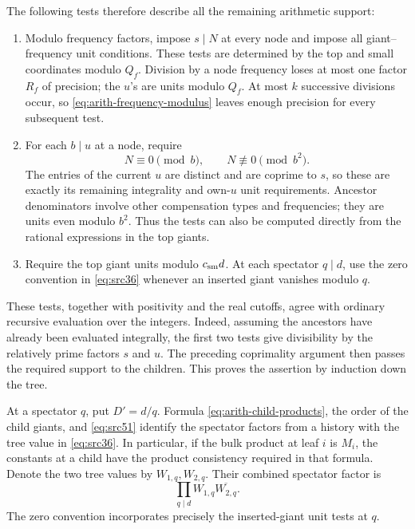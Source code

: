 The following tests therefore describe all the remaining arithmetic support:
\begin{enumerate}
\item Modulo frequency factors, impose $s\mid N$ at every node and impose
all giant--frequency unit conditions. These tests are determined by the top
and small coordinates modulo $Q_f$. Division by a node frequency loses at
most one factor $R_f$ of precision; the $u$'s are units modulo $Q_f$. At most
$k$ successive divisions occur, so \eqref{eq:arith-frequency-modulus} leaves
enough precision for every subsequent test.
\item For each $b\mid u$ at a node, require
\begin{equation}\label{eq:arith-internal-tests}
                        N\equiv0\pmod b,
             \qquad N\not\equiv0\pmod{b^2}.
\end{equation}
The entries of the current $u$ are distinct and are coprime to $s$, so these
are exactly its remaining integrality and own-$u$ unit requirements.
Ancestor denominators involve other compensation types and frequencies;
they are units even modulo $b^2$. Thus the tests can also be computed directly
from the rational expressions in the top giants.
\item Require the top giant units modulo $c_{\rm sm}d$. At each spectator
$q\mid d$, use the zero convention in \eqref{eq:src36} whenever an inserted
giant vanishes modulo $q$.
\end{enumerate}
These tests, together with positivity and the real cutoffs, agree with
ordinary recursive evaluation over the integers. Indeed, assuming the
ancestors have already been evaluated integrally, the first two tests give
divisibility by the relatively prime factors $s$ and $u$. The preceding
coprimality argument then passes the required support to the children. This
proves the assertion by induction down the tree.

At a spectator $q$, put $D'=d/q$. Formula
\eqref{eq:arith-child-products}, the order of the child giants, and
\eqref{eq:src51} identify the spectator factors from a history with the tree
value in \eqref{eq:src36}. In particular, if the bulk product at leaf $i$ is
$M_i$, the constants at a child have the product consistency required in that
formula. Denote the two tree values by $W_{1,q},W_{2,q}$. Their combined
spectator factor is
\begin{equation}\label{eq:arith-spectator-product}
                         \prod_{q\mid d}W_{1,q}\overline{W_{2,q}}.
\end{equation}
The zero convention incorporates precisely the inserted-giant unit tests at
$q$.

